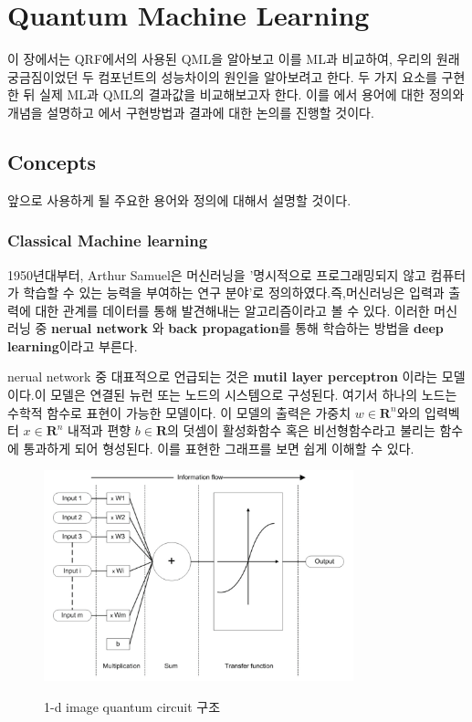 \section{Quantum Machine Learning}
 이 장에서는 QRF에서의 사용된 QML을 알아보고 이를 ML과 비교하여, 우리의 원래 궁금짐이었던 두 컴포넌트의 성능차이의 원인을 알아보려고 한다. 두 가지 요소를 구현한 뒤 실제 ML과 QML의 결과값을 비교해보고자 한다. 이를 에서 용어에 대한 정의와 개념을 설명하고 에서 구현방법과 결과에 대한 논의를 진행할 것이다.

 \subsection{Concepts} \label{qml:concepts}

 앞으로 사용하게 될 주요한 용어와 정의에 대해서 설명할 것이다.

      \subsubsection{Classical Machine learning} 1950년대부터, Arthur Samuel은 머신러닝을 '명시적으로 프로그래밍되지 않고 컴퓨터가 학습할 수 있는 능력을 부여하는 연구 분야'로 정의하였다\citep{schuld2015introduction}.즉,머신러닝은 입력과 출력에 대한 관계를 데이터를 통해 발견해내는 알고리즘이라고 볼 수 있다. 이러한 머신러닝 중 \textbf{nerual network} 와 \textbf{back propagation}를 통해 학습하는 방법을 \textbf{deep learning}이라고 부른다.

      nerual network 중 대표적으로 언급되는 것은 \textbf{mutil layer perceptron} 이라는 모델이다.이 모델은 연결된 뉴런 또는 노드의 시스템으로 구성된다.\cite{gardner1998artificial} 여기서 하나의 노드는 수학적 함수로 표현이 가능한 모델이다. 이 모델의 출력은 가중치 $w \in \mathbf{R}^n $와의 입력벡터 $x \in \mathbf{R}^n $ 내적과 편향 $b \in \mathbf{R}$의 덧셈이 활성화함수 혹은 비선형함수라고 불리는 함수에 통과하게 되어 형성된다.\cite{krenker2011introduction}
      이를 표현한 그래프를 보면 쉽게 이해할 수 있다.

      \begin{figure}[h]
        \centering
        \includegraphics[width=0.8\textwidth]{figs/node.png}\
        \caption{1-d image quantum circuit 구조}
        \label{fig:node-image}
        \end{figure}

